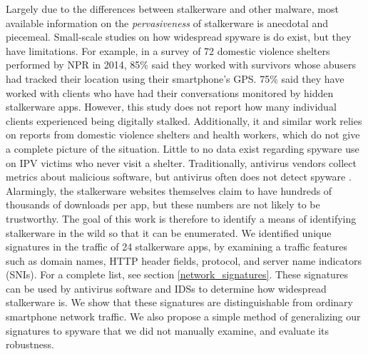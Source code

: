 \documentclass[acmtog]{acmart}
\begin{document}
Largely due to the differences between stalkerware and other malware, most 
available information on the \textit{pervasiveness} of stalkerware is anecdotal 
and piecemeal. Small-scale studies on how widespread spyware is do exist, but 
they have limitations. For example, in a survey of 72 
domestic violence shelters performed by NPR in 2014, 85\% said they worked with 
survivors whose abusers had tracked their location using their smartphone's 
GPS. 75\% said they have worked with clients who have had their conversations 
monitored by hidden stalkerware apps.\cite{shahani_smartphones_nodate} However, 
this study does not report how many individual clients experienced being 
digitally stalked. Additionally, it and similar work relies on 
reports from domestic violence shelters and health workers, which do not give 
a complete picture of the situation. Little to no data exist regarding spyware 
use on IPV victims who never visit a shelter. Traditionally, antivirus vendors 
collect metrics about 
malicious software, but antivirus often does not detect spyware 
\cite{chatterjee_spyware_2018}. Alarmingly, the stalkerware 
websites themselves claim to have hundreds of thousands of downloads per app, 
but these numbers are not likely to be trustworthy. The goal of this work is 
therefore to identify a means of identifying stalkerware in the wild so that it 
can be enumerated. We identified unique signatures in the traffic of 24 
stalkerware apps, by examining a traffic features such as domain names, HTTP 
header fields, protocol, and server name indicators (SNIs). For a complete 
list, see section \ref{network_signatures}. These signatures can be used by 
antivirus software and IDSs to determine how widespread stalkerware is. We show 
that these signatures are distinguishable from ordinary smartphone 
network traffic. We also propose a simple method of generalizing our signatures 
to spyware that we did not manually examine, and evaluate its robustness.
\end{document}
